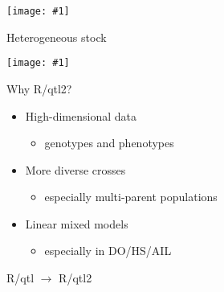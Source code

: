 \documentclass[12pt]{article}
\newcommand{\headsize}{\fontsize{35}{35} \selectfont}
\newcommand{\smallsize}{\fontsize{25}{30} \selectfont}
\newcommand{\smallersize}{\fontsize{20}{25} \selectfont}
\newcommand{\figh}[2]{\centerline{\texttt{[image: \#1]}}}
\begin{document}
\vspace{5mm}

\figh{Figs/ri8.pdf}{0.9}


\newpage

\headsize \color{myyellow}
\hfill \begin{minipage}{5.75in}
\centering
Heterogeneous stock
\end{minipage}


\vspace{5mm}

\figh{Figs/hs.pdf}{0.9}





\newpage

\headsize \color{myyellow}
\hfill \begin{minipage}{5.75in}
\centering
Why R/qtl2?
\end{minipage}

\vspace{3cm}

\color{mywhite} \smallsize

\hfill \begin{minipage}[t]{9.5in}
\begin{itemize}
\itemsep24pt
\setlength{\rightskip}{0pt plus 1fil} %
\item High-dimensional data
  \begin{itemize}
  \item[] {\color{myblue} \smallersize genotypes and phenotypes}
  \end{itemize}
\item More diverse crosses
  \begin{itemize}
  \item[] {\color{myblue} \smallersize especially multi-parent populations}
  \end{itemize}
\item Linear mixed models
  \begin{itemize}
  \item[] {\color{myblue} \smallersize especially in DO/HS/AIL}
  \end{itemize}
\end{itemize} \end{minipage}


\newpage

\headsize \color{myyellow}
\hfill\begin{minipage}{5.75in}
\centering
R/qtl $\rightarrow$ R/qtl2
\end{minipage}
\end{document}
